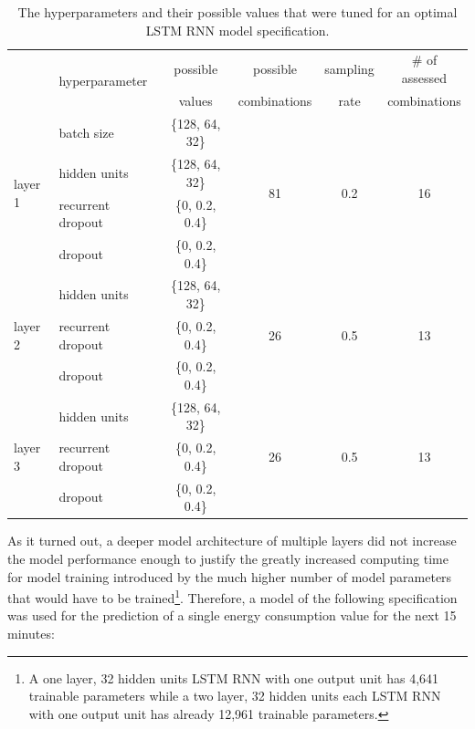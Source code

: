 \begin{table}[htbp]
    \begin{center}
        {\footnotesize
        \begin{tabular}{l|lcccc}
        \hline \hline
        & \multirow{2}{3em}{hyperparameter} & possible & possible     & sampling & \# of assessed \\
        &                                   & values   & combinations & rate     & combinations   \\
        \hline
                \multirow{4}{3em}{layer 1}  & batch size        & \{128, 64, 32\} & \multirow{4}{1em}{81} & \multirow{4}{1em}{0.2} & \multirow{4}{1em}{16} \\
                                            & hidden units      & \{128, 64, 32\} & & &\\
                                            & recurrent dropout & \{0, 0.2, 0.4\} & & & \\
                                            & dropout           & \{0, 0.2, 0.4\} & & & \\[0.2cm]
                                            & hidden units      & \{128, 64, 32\} & & & \\
                layer 2                     & recurrent dropout & \{0, 0.2, 0.4\} & 26 & 0.5 & 13 \\
                                            & dropout           & \{0, 0.2, 0.4\} & \\[0.2cm]
                                            & hidden units      & \{128, 64, 32\} & \\
                layer 3                     & recurrent dropout & \{0, 0.2, 0.4\} & 26 & 0.5 & 13 \\
                                            & dropout           & \{0, 0.2, 0.4\} & \\
            \hline \hline
        \end{tabular}}
    \end{center}
    \caption[Hyperparameters tuned for optimal LSTM RNN model specification]{The hyperparameters and their possible values that were tuned for an optimal LSTM RNN model specification.}
    \label{Tab:LSTMHyperparameters}
\end{table}

As it turned out, a deeper model architecture of multiple layers did not increase the model performance enough to justify the greatly increased computing time for model training introduced by the much higher number of model parameters that would have to be trained\footnote{A one layer, 32 hidden units LSTM RNN with one output unit has 4,641 trainable parameters while a two layer, 32 hidden units each LSTM RNN with one output unit has already 12,961 trainable parameters.}. Therefore, a model of the following specification was used for the prediction of a single energy consumption value for the next 15 minutes:

